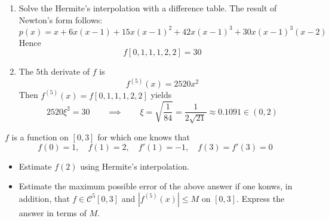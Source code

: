 \documentclass[11pt]{elegantbook}
\begin{document}
\begin{solution}
  \begin{enumerate}
    \item Solve the Hermite's interpolation with a difference table. The result of Newton's form follows:
    \begin{equation*}
      p(x)=x+6x(x-1)+15x(x-1)^2+42x(x-1)^3+30x(x-1)^3(x-2)
    \end{equation*}
    Hence
    \begin{equation*}
      f[0,1,1,1,2,2]=30
    \end{equation*}

    \item The $5$th derivate of $f$ is
    \begin{equation*}
      f^{(5)}(x)=2520x^2
    \end{equation*}
    Then $f^{(5)}(x)=f[0,1,1,1,2,2]$ yields
    \begin{equation*}
      2520\xi^2=30 \qquad \implies \qquad \xi=\sqrt{\frac{1}{84}}=\frac{1}{2\sqrt{21}}\approx 0.1091\in(0,2)
    \end{equation*}
  \end{enumerate}
\end{solution}

\vspace{1.5em}

\begin{problem}
  $f$ is a function on $[0,3]$ for which one knows that
  \begin{equation*}
    f(0)=1,\quad f(1)=2,\quad f'(1)=-1,\quad f(3)=f'(3)=0
  \end{equation*}
  \begin{itemize}
    \item Estimate $f(2)$ using Hermite's interpolation.
    \item Estimate the maximum possible error of the above answer if one konws, in addition, that $f\in \mathcal{C}^5[0,3]$ and $|f^{(5)}(x)|\leq M$ on $[0,3]$. Express the answer in terms of $M$.
  \end{itemize}
\end{problem}
\end{document}
